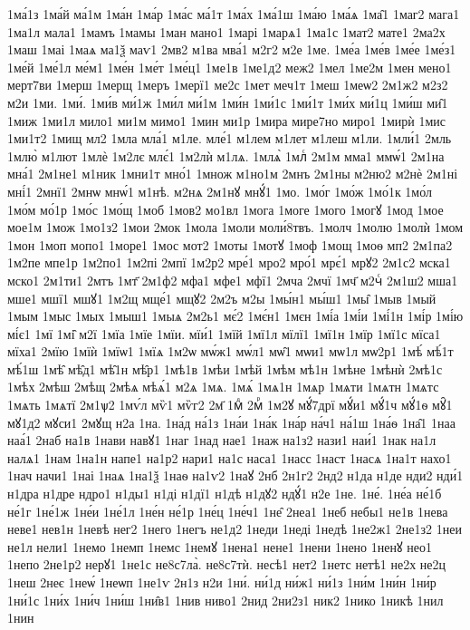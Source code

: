 {1ма́1з
1ма́й
ма́1м
1ма́н
1ма́р
1ма́с
ма́1т
1ма́х
1ма́1ш
1ма́ю
1ма́ѧ
1ма̑1
1маг2
мага1
1ма1л
мала1
1мамъ
1мамы
1ман
мано1
1марі
1марѧ1
1ма1с
1мат2
мате1
2ма2х
1маш
1маі
1маѧ
ма1ѯ
маѵ1
2мв2
м1ва
мва́1
м2г2
м2е
1ме.
1ме́а
1ме́в
1ме́е
1ме́з1
1ме́й
1ме́1л
ме́м1
1ме́н
1ме́т
1ме́ц1
1ме1в
1ме1д2
меж2
1мел
1ме2м
1мен
мено1
мерт7ви
1мерш
1мерщ
1меръ
1мерї1
ме2с
1мет
меч1т
1меш
1меѡ2
2м1ж2
м2з2
м2и
1ми.
1ми́.
1ми́в
ми́1ж
1ми́л
ми́1м
1ми́н
1ми́1с
1ми́1т
1ми́х
ми́1ц
1ми́ш
ми̑1
1миж
1ми1л
мило1
ми1м
мимо1
1мин
ми1р
1мира
мире7но
миро1
1мирѝ
1мис
1ми1т2
1мищ
мл2
1мла
мла́1
м1ле.
мле́1
м1лем
м1лет
м1леш
м1ли.
1мли́1
2мль
1млю̀
м1лют
1млѐ
1м2лє
млє́1
1м2лѝ
м1лѧ.
1млѧ̀
1млⷭ
2м1м
мма1
ммѡ́1
2м1на
мна́1
2м1не1
м1ник
1мни1т
мно́1
1множ
м1но1м
2мнъ
2м1ны
м2ню2
м2нѐ
2м1ні
мні́1
2мнї1
2мнѡ
мнѡ́1
м1нѣ.
м2нѧ
2м1нꙋ
мнꙋ́1
1мо.
1мо́г
1мо́ж
1мо́1к
1мо́л
1мо́м
мо́1р
1мо́с
1мо́щ
1моб
1мов2
мо1вл
1мога
1моге
1мого
1могꙋ
1мод
1мое
мое1м
1мож
1мо1з2
1мои
2мок
1мола
1моли
моли́8твъ.
1молч
1молю
1молѝ
1мом
1мон
1моп
мопо1
1море1
1мос
мот2
1моты
1мотꙋ
1моф
1мощ
1моѳ
мп2
2м1па2
1м2пе
мпе1р
1м2по1
1м2пі
2мпї
1м2р2
мре́1
мро2
мро́1
мрє́1
мрꙋ2
2м1с2
мска1
мско1
2м1ти1
2мтъ
1мт҃
2м1ф2
мфа1
мфе1
мфї1
2мча
2мчї
1мч҃
м2чⷭ
2м1ш2
мша1
мше1
мшї1
мшꙋ1
1м2щ
мще́1
мщꙋ2
2м2ъ
м2ы
1мы́н1
мы́ш1
1мы̑
1мыв
1мый
1мым
1мыс
1мых
1мыш1
1мыѧ
2м2ь1
мє́2
1мє́н1
1мєн
1мі́а
1мі́и
1мі́1н
1мі́р
1мі́ю
мі́є1
1мї
1мі̑
м2ї
1мїа
1мїе
1мїи.
мїи́1
1мїй
1мї1л
мїлї1
1мї1н
1мїр
1мї1с
мїса1
мїха1
2мїю
1мїѝ
1мїѡ1
1мїѧ
1м2ѡ
мѡ́ж1
мѡ́л1
мѡ̑1
мѡи1
мѡ1л
мѡ2р1
1мѣ́
мѣ́1т
мѣ́1ш
1мѣ̑
мѣ̑д1
мѣ̑1н
мѣ̑р1
1мѣ1в
1мѣи
1мѣй
1мѣм
мѣ1н
1мѣне
1мѣнѝ
2мѣ1с
1мѣх
2мѣш
2мѣщ
2мѣѧ
мѣѧ́1
м2ѧ
1мѧ.
1мѧ́
1мѧ1н
1мѧр
1мѧти
1мѧтн
1мѧтс
1мѧть
1мѧтї
2м1ѱ2
1мѵ́л
мѷ1
мѷг2
2м҃
1мⷣ
2мⷬ
1м2ꙋ
мꙋ́7дрї
мꙋ́и1
мꙋ́1ч
мꙋ́1ѳ
мꙋ̑1
мꙋ1д2
мꙋси1
2мꙋщ
н2а
1на.
1на́д
на́1з
1на́и
1на́к
1на́р
на́ч1
на́1ш
1на́ѳ
1на̑1
1наа
наа́1
2наб
на1в
1нави
навꙋ1
1наг
1над
нае1
1наж
на1з2
нази1
наи́1
1нак
на1л
налѧ1
1нам
1на1н
напе1
на1р2
нари1
на1с
наса1
1насс
1наст
1насѧ
1на1т
нахо1
1нач
начи1
1наі
1наѧ
1на1ѯ
1наѳ
на1ѵ2
1наꙋ
2нб
2н1г2
2нд2
н1да
н1де
нди2
нди́1
н1дра
н1дре
ндро1
н1ды1
н1ді
н1дї1
н1дѣ
н1дꙋ2
ндꙋ́1
н2е
1не.
1не́.
1не́а
не́1б
не́1г
1не́1ж
1не́и
1не́1л
1не́н
не́1р
1не́ц
1не́ч1
1не̑
2неа1
1неб
небы1
не1в
1нева
неве1
нев1н
1невѣ
нег2
1него
1негъ
не1д2
1неди
1неді
1недѣ
1не2ж1
2не1з2
1неи
не1л
нели1
1немо
1немп
1немс
1немꙋ
1нена1
нене1
1нени
1нено
1ненꙋ
нео1
1непо
2не1р2
нерꙋ1
1не1с
не8с7ла̀.
не8с7тѝ.
несѣ1
нет2
1нетс
нетѣ1
не2х
не2ц
1неш
2неє
1неѡ́
1неѡп
1не1ѵ
2н1з
н2и
1ни́.
ни́1д
ни́ж1
ни́1з
1ни́м
1ни́н
1ни́р
1ни́1с
1ни́х
1ни́ч
1ни́ш
1ни̑в1
1нив
ниво1
2нид
2ни2з1
ник2
1нико
1никѣ
1нил
1нин
}
